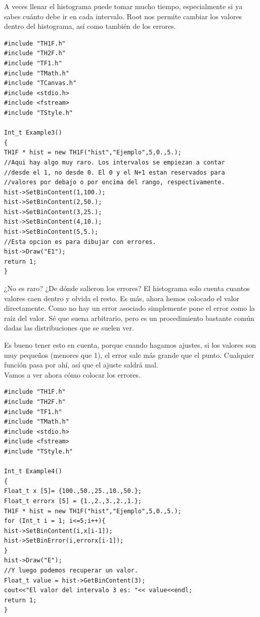 \documentclass{article}
\begin{document}
A veces llenar el histograma puede tomar mucho tiempo, especialmente si ya sabes cu\'anto debe ir en cada intervalo. Root nos permite cambiar los valores dentro del histograma, as\'i como tambi\'en de los errores.

\begin{tcolorbox} [breakable]
\begin{verbatim}
#include "TH1F.h"
#include "TH2F.h"
#include "TF1.h"
#include "TMath.h"
#include "TCanvas.h"
#include <stdio.h>
#include <fstream>
#include "TStyle.h"

Int_t Example3()
{
TH1F * hist = new TH1F("hist","Ejemplo",5,0.,5.);
//Aqui hay algo muy raro. Los intervalos se empiezan a contar
//desde el 1, no desde 0. El 0 y el N+1 estan reservados para
//valores por debajo o por encima del rango, respectivamente.
hist->SetBinContent(1,100.);
hist->SetBinContent(2,50.);
hist->SetBinContent(3,25.);
hist->SetBinContent(4,10.);
hist->SetBinContent(5,5.);
//Esta opcion es para dibujar con errores.
hist->Draw("E1");
return 1;
}
\end{verbatim}
\end{tcolorbox}
¿No es raro? ¿De d\'onde salieron los errores? El histograma solo cuenta cuantos valores caen dentro y olvida el resto. Es m\'as, ahora hemos colocado el valor directamente.
Como no hay un error asociado simplemente pone el error como la ra\'iz del valor. S\'e que suena arbitrario, pero es un procedimiento bastante com\'un dadas las distribuciones que se suelen ver.\par
Es bueno tener esto en cuenta, porque cuando hagamos ajustes, si los valores son muy pequeños (menores que 1), el error sale m\'as grande que el punto. Cualquier funci\'on pasa por ah\'i, as\'i que el ajuste saldr\'a mal.\\
Vamos a ver ahora c\'omo colocar los errores.
\begin{tcolorbox} [breakable]
\begin{verbatim}
#include "TH1F.h"
#include "TH2F.h"
#include "TF1.h"
#include "TMath.h"
#include <stdio.h>
#include <fstream>
#include "TStyle.h"

Int_t Example4()
{
Float_t x [5]= {100.,50.,25.,10.,50.};
Float_t errorx [5] = {1.,2.,3.,2.,1.};
TH1F * hist = new TH1F("hist","Ejemplo",5,0.,5.);
for (Int_t i = 1; i<=5;i++){
hist->SetBinContent(i,x[i-1]);
hist->SetBinError(i,errorx[i-1]);
}
hist->Draw("E");
//Y luego podemos recuperar un valor.
Float_t value = hist->GetBinContent(3);
cout<<"El valor del intervalo 3 es: "<< value<<endl;
return 1;
}
\end{verbatim}
\end{tcolorbox}
\end{document}

